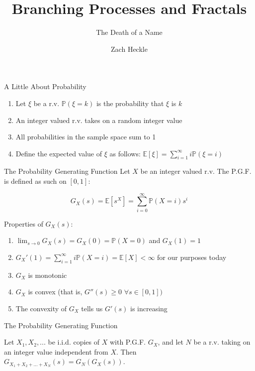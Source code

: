 \documentclass{beamer}
\title{Branching Processes and Fractals}
\subtitle{The Death of a Name}
\author{Zach Heckle}
\begin{document}
\begin{frame}
\titlepage
\end{frame}

\begin{frame}{A Little About Probability}
\begin{enumerate}
\item Let $\xi$ be a r.v. $\mathbb{P}(\xi = k)$ is the probability that $\xi$ is $k$
\pause
\item An integer valued r.v. takes on a random integer value
\pause
\item All probabilities in the sample space sum to 1
\pause
\item Define the expected value of $\xi$ as follows: $\mathbb{E}[\xi] = \sum_{i=1}^{\infty} i\mathbb{P}(\xi = i)$
\end{enumerate}
\end{frame}

\begin{frame}{The Probability Generating Function}
Let $X$ be an integer valued r.v. The P.G.F. is defined as such on $[0,1]$:

$$G_X(s) = \mathbb{E}[s^X] = \sum_{i=0}^{\infty} \mathbb{P}(X=i)s^i $$

\pause
Properties of $G_X(s)$:
\begin{enumerate}
\pause
\item $\lim_{s \to 0} G_X(s) = G_X(0) = \mathbb{P}(X=0)$ and $G_X(1) = 1$
\pause
\item $G_X'(1) = \sum_{i=1}^{\infty} i\mathbb{P}(X=i) = \mathbb{E}[X] < \infty$ for our purposes today
\pause
\item $G_X$ is monotonic
\pause
\item $G_X$ is convex (that is, $G''(s) \ge 0$ $\forall s \in [0,1])$
\pause
\item The convexity of $G_X$ tells us $G'(s)$ is increasing
\end{enumerate}
\end{frame}

\begin{frame}{The Probability Generating Function}
\begin{corollary}
Let $X_1, X_2, ...$ be i.i.d. copies of $X$ with P.G.F. $G_X$, and let $N$ be a r.v. taking on an integer value independent from $X$. Then $G_{X_1 + X_2 + ... + X_N}(s) = G_N(G_X(s))$.
\end{corollary}
\end{frame}
\end{document}
